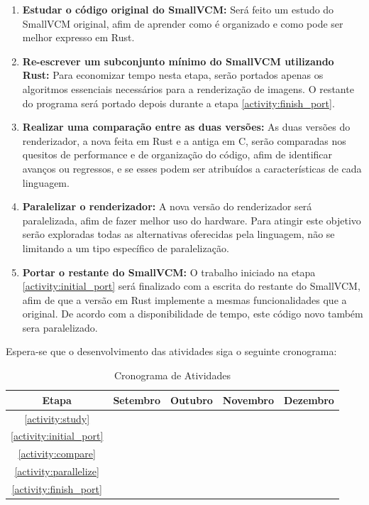 \documentclass[12pt]{article}
\def\Cpp{{C\nolinebreak[4]\raisebox{.20ex}{\small\bf++}}}
\begin{document}
\begin{enumerate}
	\item \label{activity:study} \textbf{Estudar o código original do SmallVCM:}
		Será feito um estudo do SmallVCM original, afim de aprender como é organizado e como pode
		ser melhor expresso em Rust.
	\item \label{activity:initial_port} \textbf{Re-escrever um subconjunto mínimo do SmallVCM utilizando Rust:}
		Para economizar tempo nesta etapa, serão portados apenas os algoritmos essenciais
		necessários para a renderização de imagens. O restante do programa será portado depois
		durante a etapa \ref{activity:finish_port}.
	\item \label{activity:compare} \textbf{Realizar uma comparação entre as duas versões:}
		As duas versões do renderizador, a nova feita em Rust e a antiga em \Cpp, serão comparadas
		nos quesitos de performance e de organização do código, afim de identificar avanços ou
		regressos, e se esses podem ser atribuídos a características de cada linguagem.
	\item \label{activity:parallelize} \textbf{Paralelizar o renderizador:}
		A nova versão do renderizador será paralelizada, afim de fazer melhor uso do hardware. Para
		atingir este objetivo serão exploradas todas as alternativas oferecidas pela linguagem, não
		se limitando a um tipo específico de paralelização.
	\item \label{activity:finish_port} \textbf{Portar o restante do SmallVCM:}
		O trabalho iniciado na etapa \ref{activity:initial_port} será finalizado com a escrita do
		restante do SmallVCM, afim de que a versão em Rust implemente a mesmas funcionalidades que a
		original. De acordo com a disponibilidade de tempo, este código novo também sera
		paralelizado.
\end{enumerate}

Espera-se que o desenvolvimento das atividades siga o seguinte cronograma:

\begin{table}[ht]
\centering
\begin{tabular}{c|cccc}
	Etapa & Setembro & Outubro & Novembro & Dezembro \\ \hline
	\ref{activity:study} & \checkmark & & & \\
	\ref{activity:initial_port} & \checkmark & \checkmark & & \\
	\ref{activity:compare} & & \checkmark & & \checkmark \\
	\ref{activity:parallelize} & & \checkmark & \checkmark & \checkmark \\
	\ref{activity:finish_port} & & & \checkmark & \checkmark \\
\end{tabular}
\caption{Cronograma de Atividades}
\end{table}
\end{document}
